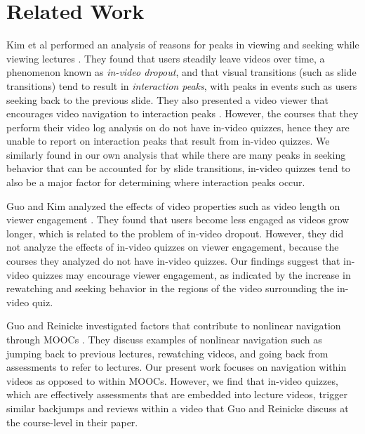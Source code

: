 \documentclass{sigchi}
\begin{document}

\newpage

\section{Related Work}

Kim et al performed an analysis of reasons for peaks in viewing and seeking while viewing lectures \cite{juho}. They found that users steadily leave videos over time, a phenomenon known as \emph{in-video dropout}, and that visual transitions (such as slide transitions) tend to result in \emph{interaction peaks}, with peaks in events such as users seeking back to the previous slide. They also presented a video viewer that encourages video navigation to interaction peaks  \cite{juho2}. However, the courses that they perform their video log analysis on do not have in-video quizzes, hence they are unable to report on interaction peaks that result from in-video quizzes. We similarly found in our own analysis that while there are many peaks in seeking behavior that can be accounted for by slide transitions, in-video quizzes tend to also be a major factor for determining where interaction peaks occur. %

Guo and Kim analyzed the effects of video properties such as video length on viewer engagement \cite{guovideo}. They found that users become less engaged as videos grow longer, which is related to the problem of in-video dropout. However, they did not analyze the effects of in-video quizzes on viewer engagement, because the courses they analyzed do not have in-video quizzes. Our findings suggest that in-video quizzes may encourage viewer engagement, as indicated by the increase in rewatching and seeking behavior in the regions of the video surrounding the in-video quiz. %

Guo and Reinicke investigated factors that contribute to nonlinear navigation through MOOCs \cite{guodemographics}. They discuss examples of nonlinear navigation such as jumping back to previous lectures, rewatching videos, and going back from assessments to refer to lectures. Our present work focuses on navigation within videos as opposed to within MOOCs. However, we find that in-video quizzes, which are effectively assessments that are embedded into lecture videos, trigger similar backjumps and reviews within a video that Guo and Reinicke discuss at the course-level in their paper.
\end{document}
